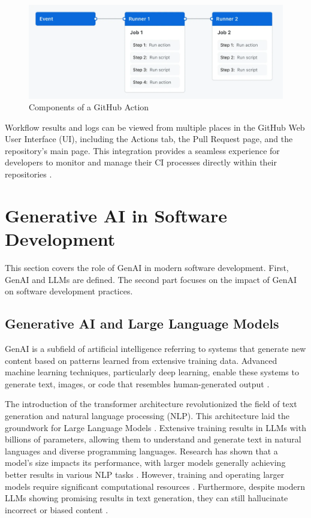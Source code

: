 \begin{figure}[H]
    \centering
    \includegraphics[width=1\textwidth]{images/overview-actions-simple.png}
    \caption{Components of a GitHub Action}
    \label{fig:gh-workflow}
\end{figure}

Workflow results and logs can be viewed from multiple places in the GitHub Web User Interface (UI), including the Actions tab, the Pull Request page, and the repository's main page. This integration provides a seamless experience for developers to monitor and manage their CI processes directly within their repositories \cite{GitHubActions2025}.


\section{Generative AI in Software Development}

This section covers the role of \ac{GenAI} in modern software development. First, \ac{GenAI} and \acp{LLM} are defined. The second part focuses on the impact of \ac{GenAI} on software development practices.

\subsection{Generative AI and Large Language Models}
\ac{GenAI} is a subfield of artificial intelligence referring to systems that generate new content based on patterns learned from extensive training data. Advanced machine learning techniques, particularly deep learning, enable these systems to generate text, images, or code that resembles human-generated output \cite{WhatGenerativeAI2021}.

The introduction of the transformer architecture revolutionized the field of text generation and natural language processing (NLP). This architecture laid the groundwork for Large Language Models \cite{changSurveyEvaluationLarge2024, naveedComprehensiveOverviewLarge2024}. Extensive training results in \acp{LLM} with billions of parameters, allowing them to understand and generate text in natural languages and diverse programming languages. Research has shown that a model's size impacts its performance, with larger models generally achieving better results in various NLP tasks \cite{kaplanScalingLawsNeural2020}. However, training and operating larger models require significant computational resources \cite{LLMsWhatsLarge, naveedComprehensiveOverviewLarge2024}. Furthermore, despite modern \acp{LLM} showing promising results in text generation, they can still hallucinate incorrect or biased content \cite{LLMsWhatsLarge}.

